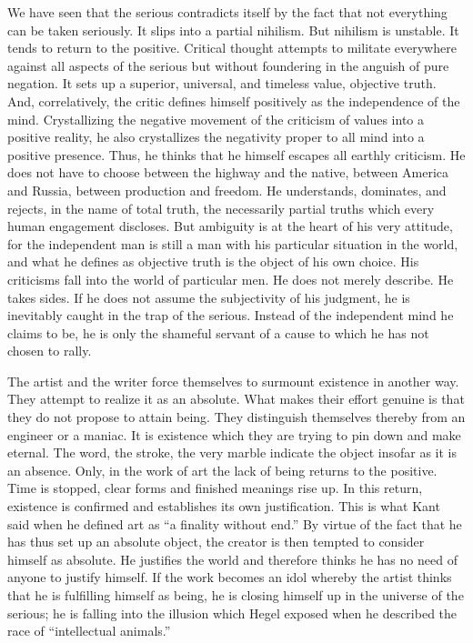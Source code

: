 \documentclass[11pt]{article}
\begin{document}
We have seen that the serious contradicts itself by the fact that not everything can be taken seriously. It slips into a partial nihilism. But nihilism is unstable. It tends to return to the positive. Critical thought attempts to militate everywhere against all aspects of the serious but without foundering in the anguish of pure negation. It sets up a superior, universal, and timeless value, objective truth. And, correlatively, the critic defines himself positively as the independence of the mind. Crystallizing the negative movement of the criticism of values into a positive reality, he also crystallizes the negativity proper to all mind into a positive presence. Thus, he thinks that he himself escapes all earthly criticism. He does not have to choose between the highway and the native, between America and Russia, between production and freedom. He understands, dominates, and rejects, in the name of total truth, the necessarily partial truths which every human engagement discloses. But ambiguity is at the heart of his very attitude, for the independent man is still a man with his particular situation in the world, and what he defines as objective truth is the object of his own choice. His criticisms fall into the world of particular men. He does not merely describe. He takes sides. If he does not assume the subjectivity of his judgment, he is inevitably caught in the trap of the serious. Instead of the independent mind he claims to be, he is only the shameful servant of a cause to which he has not chosen to rally.

The artist and the writer force themselves to surmount existence in another way. They attempt to realize it as an absolute. What makes their effort genuine is that they do not propose to attain being. They distinguish themselves thereby from an engineer or a maniac. It is existence which they are trying to pin down and make eternal. The word, the stroke, the very marble indicate the object insofar as it is an absence. Only, in the work of art the lack of being returns to the positive. Time is stopped, clear forms and finished meanings rise up. In this return, existence is confirmed and establishes its own justification. This is what Kant said when he defined art as “a finality without end.” By virtue of the fact that he has thus set up an absolute object, the creator is then tempted to consider himself as absolute. He justifies the world and therefore thinks he has no need of anyone to justify himself. If the work becomes an idol whereby the artist thinks that he is fulfilling himself as being, he is closing himself up in the universe of the serious; he is falling into the illusion which Hegel exposed when he described the race of “intellectual animals.”
\end{document}
